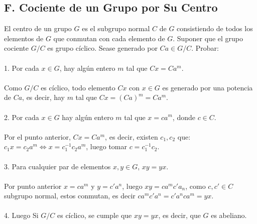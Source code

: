\documentclass{article}
\begin{document}
\subsection*{F. Cociente de un Grupo por Su Centro}
El centro de un grupo $G$ es el subgrupo normal $C$ de $G$ consistiendo de todos los elementos de $G$ que conmutan con cada elemento de $G$. Suponer que el grupo cociente $G/C$ es grupo cíclico. Sease generado por $Ca \in G/C$. Probar:
\\
\\
1. Por cada $x \in G$, hay algún entero $m$ tal que $Cx=Ca^{m}$.
\\
\\
Como $G/C$ es cíclico, todo elemento $Cx$ con $x \in G$ es generado por una potencia de $Ca$, es decir, hay $m$ tal que $Cx=(Ca)^{m}=Ca^{m}$.
\\
\\
2. Por cada $x \in G$ hay algún entero $m$ tal que $x=ca^{m}$, donde $c \in C$.
\\
\\
Por el punto anterior, $Cx=Ca^{m}$, es decir, existen $c_1,c_2$ que: $c_1x=c_2a^{m} \Longleftrightarrow x=c_1^{-1}c_2a^{m}$, luego tomar $c=c_{1}^{-1}c_2$.
\\
\\
3. Para cualquier par de elementos $x,y \in G$, $xy=yx$.
\\
\\
Por punto anterior $x=ca^{m}$ y $y=c'a^{n}$, luego $xy=ca^{m}c'a_{n}$, como $c,c' \in C$ subgrupo normal, estos conmutan, es decir $ca^{m}c'a^{n}=c'a^{n}ca^{m}=yx$.
\\
\\
4. Luego Si $G/C$ es cíclico, se cumple que $xy=yx$, es decir, que $G$ es abeliano.
\\
\\
\end{document}
